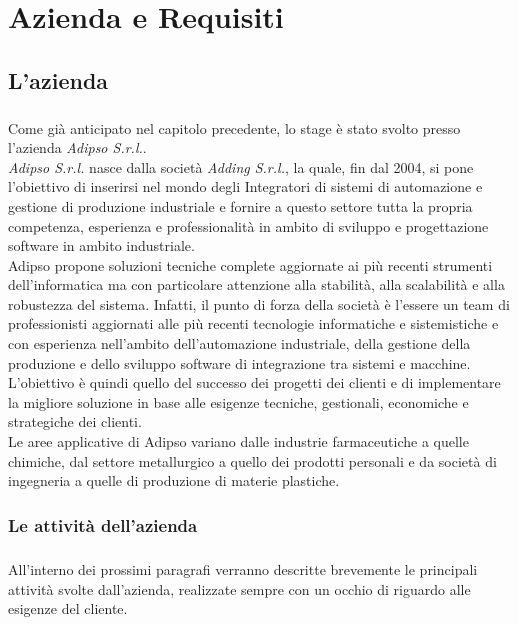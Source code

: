 \chapter{Azienda e Requisiti}
  \label{chapter_azienda_requisiti}
  \section{L'azienda}
  \paragraph{}
  Come già anticipato nel capitolo precedente, lo stage è stato svolto presso l'azienda \textit{Adipso S.r.l.}.\\
  \textit{Adipso S.r.l.} nasce dalla società \textit{Adding S.r.l.}, la quale, fin dal 2004, si pone l'obiettivo di inserirsi nel
  mondo degli Integratori di sistemi di automazione e gestione di produzione industriale e fornire
  a questo settore tutta la propria competenza, esperienza e professionalità in ambito di sviluppo e progettazione
  software in ambito industriale.\\
  Adipso propone soluzioni tecniche complete aggiornate ai più recenti strumenti dell'informatica
  ma con particolare attenzione alla stabilità, alla scalabilità e alla robustezza del sistema. Infatti, 
  il punto di forza della società è l'essere un team di professionisti aggiornati alle più recenti tecnologie 
  informatiche e sistemistiche e con esperienza nell'ambito dell'automazione industriale, della gestione 
  della produzione e dello sviluppo software di integrazione tra sistemi e macchine.\\
  L'obiettivo è quindi quello del successo dei progetti dei clienti e di implementare la migliore soluzione 
  in base alle esigenze tecniche, gestionali, economiche e strategiche dei clienti.\\
  Le aree applicative di Adipso variano dalle industrie farmaceutiche a quelle chimiche, dal settore metallurgico 
  a quello dei prodotti personali e da società di ingegneria a quelle di produzione di materie plastiche.
  \subsection{Le attività dell'azienda}
  \paragraph{}
  All'interno dei prossimi paragrafi verranno descritte brevemente le principali attività svolte
  dall'azienda, realizzate sempre con un occhio di riguardo alle esigenze del cliente.
